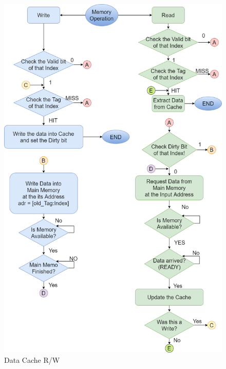     \begin{figure}[H]
        \centering
        \includegraphics[width=\textwidth]{images/cache/cache_system_flowchart.png}
        \caption{Data Cache R/W}
        \label{fig:dataCache}
    \end{figure}

